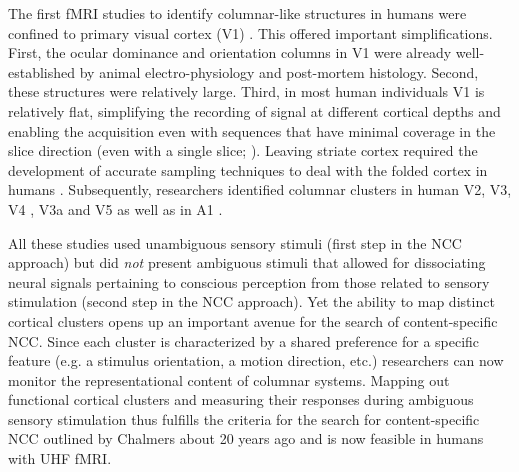 The first fMRI studies to identify columnar-like structures in humans were confined to primary visual cortex (V1) \parencite{Cheng2001, Yacoub2007, Yacoub2008}. This offered important simplifications. First, the ocular dominance and orientation columns in V1 were already well-established by animal electro-physiology \parencite{Hubel1974} and post-mortem histology. Second, these structures were relatively large. Third, in most human individuals V1 is relatively flat, simplifying the recording of signal at different cortical depths and enabling the acquisition even with sequences that have minimal coverage in the slice direction (even with a single slice; \cite{Yacoub2008}). Leaving striate cortex required the development of accurate sampling techniques to deal with the folded cortex in humans \parencite{Polimeni2017, Kemper2017}. Subsequently, researchers identified columnar clusters in human V2, V3, V4 \parencite{Nasr2016, Tootell2017}, V3a \parencite{Goncalves2015} and V5 \parencite{Zimmermann2011} as well as in A1 \parencite{DeMartino2015}.

All these studies used unambiguous sensory stimuli (first step in the NCC approach) but did \textit{not} present ambiguous stimuli that allowed for dissociating neural signals pertaining to conscious perception from those related to sensory stimulation (second step in the NCC approach). Yet the ability to map distinct cortical clusters opens up an important avenue for the search of content-specific NCC. Since each cluster is characterized by a shared preference for a specific feature (e.g. a stimulus orientation, a motion direction, etc.) researchers can now monitor the representational content of columnar systems. Mapping out functional cortical clusters and measuring their responses during ambiguous sensory stimulation thus fulfills the criteria for the search for content-specific NCC outlined by Chalmers \parencite*{Chalmers2000} about 20 years ago and is now feasible in humans with UHF fMRI.


